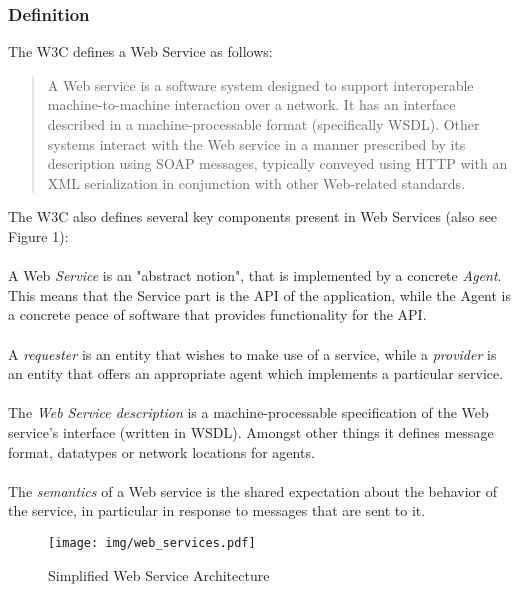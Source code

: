 \subsubsection*{Definition}
The W3C defines a Web Service as follows: 
\begin{quote}
A Web service is a software system designed to support interoperable machine-to-machine interaction over a network. It has an interface described in a machine-processable format (specifically WSDL). Other systems interact with the Web service in a manner prescribed by its description using SOAP messages, typically conveyed using HTTP with an XML serialization in conjunction with other Web-related standards. \cite{WSARCH}
\end{quote}
The W3C also defines several key components present in Web Services (also see Figure 1):
\\ \\
A Web \emph{Service} is an "abstract notion", that is implemented by a concrete \emph{Agent}. This means that the Service part is the API of the application, while the Agent is a concrete peace of software that provides functionality for the API. 
\\ \\
A \emph{requester} is an entity that wishes to make use of a service, while a \emph{provider} is an entity that offers an appropriate agent which implements a particular service. 
\\ \\
The \emph{Web Service description} is a machine-processable specification of the Web service's interface (written in WSDL). Amongst other things it defines message format, datatypes or network locations for agents. 
\\ \\
The \emph{semantics} of a Web service is the shared expectation about the behavior of the service, in particular in response to messages that are sent to it. \cite{WSARCH}
\begin{figure}[htp]
\centering
\texttt{[image: img/web\_services.pdf]}
\caption{Simplified Web Service Architecture}\label{fig:erptsqfit}
\end{figure}
\\
